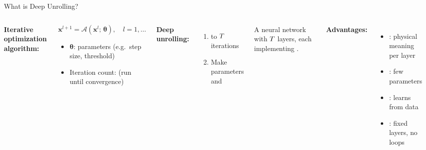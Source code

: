 \begin{frame}{What is Deep Unrolling?}
  \begin{columns}[T]
      \vspace{0.3em}
      \textbf{Iterative optimization algorithm:}

      \vspace{0.4em}
      \begin{shibuiframe}{ }
        \[
          \mathbf{x}^{l+1}
            = \mathcal{A}\!\left(\mathbf{x}^{l};\,\boldsymbol{\theta}\right),
          \quad l = 1,\ldots
        \]
        \begin{itemize}
          \item $\boldsymbol{\theta}$:  parameters
                (e.g.\ step size, threshold)
          \item Iteration count:  (run until convergence)
        \end{itemize}
      \end{shibuiframe}

      \vspace{0.6em}
      \textbf{Deep unrolling:}
      \begin{enumerate}
        \item {} to $T$ iterations
        \pause
        \item Make parameters  and 
      \end{enumerate}

      \vspace{0.4em}
      \begin{shibiunote}[Result]
        A neural network with $T$ layers,
        each implementing .
      \end{shibiunote}

      \vspace{0.3em}
      \textbf{Advantages:}
      \begin{itemize}
        \item {}: physical meaning per layer
        \pause
        \item {}: few parameters
        \pause
        \item {}: learns from data
        \pause
        \item {}: fixed layers, no loops
      \end{itemize}


\end{columns}
\end{frame}
